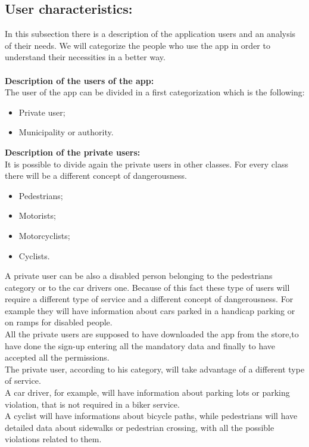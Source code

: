 \documentclass[titlepage]{article}
\begin{document}
\subsection{User characteristics: }
In this subsection there is a description of the application users and an analysis of their needs. We will categorize the people who use the app in order to understand their necessities in a better way.\\
\textbf{\\Description of the users of the app:\\}
The user of the app can be divided in a first categorization which is the following:
\begin{itemize}
	\item Private user;
	\item Municipality or authority.\\
\end{itemize}
\textbf{Description of the private users: }\\ 
It is possible to divide again the private users in other classes. For every class there will be a different concept of dangerousness.
\begin{itemize}
	\item Pedestrians;
	\item Motorists;
	\item Motorcyclists;
	\item Cyclists.
\end{itemize}
A private user can be also a disabled person belonging to the pedestrians category or to the car drivers one. Because of this fact these type of users will require a different type of service and a different concept of dangerousness. For example they will have information about cars parked in a handicap parking or on ramps for disabled people.\\
All the private users are supposed to have downloaded the app from the store,to have done the sign-up entering all the mandatory data and finally to have accepted all the permissions.\\
The private user, according to his category, will take advantage of a different type of service.\\
A car driver, for example, will have information about parking lots or parking violation, that is not required in a biker service.\\
A cyclist will have informations about bicycle paths, while pedestrians will have detailed data about sidewalks or pedestrian crossing, with all the possible violations related to them. \\
\end{document}
